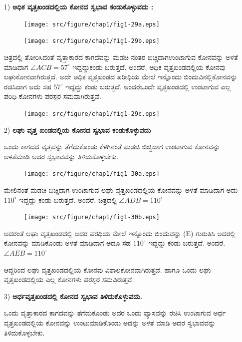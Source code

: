   \eject
    \begin{itemize}
  \item[1)] \textbf{ಅಧಿಕ ವೃತ್ತಖಂಡದಲ್ಲಿಯ ಕೋನದ ಸ್ವಭಾವ ಕಂಡುಕೊಳ್ಳುವದು :}
  \begin{figure}[H]
\centering
\texttt{[image: src/figure/chap1/fig1-29a.eps]}
\end{figure}
\begin{figure}[H]
\centering
\texttt{[image: src/figure/chap1/fig1-29b.eps]}
\end{figure}
 
 ಚಿತ್ರದಲ್ಲಿ ತೋರಿಸಿದಂತೆ ವೃತ್ತಾಕಾರದ ಕಾಗದವನ್ನು ಮಡಚಿ ನಂತರ ಬಿಚ್ಚಿದಾಗ\break ಉಂಟಾಗುವ ಕೋನವನ್ನು ಅಳತೆ ಮಾಡಿದಾಗ $\angle ACB = 57^\circ$ ಇದ್ದದ್ದು\break ಕಂಡು ಬರುತ್ತದೆ. ಅಂದರೆ, ಅಧಿಕ ವೃತ್ತಖಂಡದಲ್ಲಿಯ ಕೋನವು ಲಘುಕೋನವಾಗಿರುತ್ತದೆ. ಅದೇ ಅಧಿಕ ವೃತ್ತಖಂಡದ ಪರೀಧಿಯ ಮೇಲೆ ಇನ್ನೊಂದು ಬಿಂದುವಿನಲ್ಲಿ\break ಕೋನವನ್ನು ರಚಿಸಿದಾಗ ಅದು ಸಹ $57^\circ$ ಇದ್ದದ್ದು ಕಂಡು ಬರುತ್ತದೆ. ಅಂದರೆ\break ಒಂದೇ ವೃತ್ತಖಂಡದಲ್ಲಿ ಉಂಟಾಗುವ ಎಲ್ಲ ಪರಿಧಿ ಕೋನಗಳು ಪರಸ್ಪರ ಸಮ\break ವಾಗಿರುತ್ತವೆ. 
 \begin{figure}[H]
\centering
\texttt{[image: src/figure/chap1/fig1-29c.eps]}
\end{figure}

 \item[2)] \textbf{ಲಘು ವೃತ್ತ ಖಂಡದಲ್ಲಿಯ ಕೋನದ ಸ್ವಭಾವ ಕಂಡುಕೊಳ್ಳುವದು} 
 
 ಒಂದು ಕಾಗದದ ವೃತ್ತವನ್ನು ತೆಗೆದುಕೊಂಡು ಕೆಳಗಿನಂತೆ ಮಡಚಿ ಬಿಚ್ಚಿದಾಗ ಉಂಟಾಗುವ ಕೋನವನ್ನು ಅಳತೆಮಾಡಿ ಅದರ ಸ್ವಭಾವವನ್ನು ತಿಳಿದುಕೊಳ್ಳಬೇಕು. 
 \begin{figure}[H]
\centering
\texttt{[image: src/figure/chap1/fig1-30a.eps]}
\end{figure}
 
 ಮೇಲಿನಂತೆ ಮಡಚಿ ಬಿಚ್ಚಿದಾಗ ಉಂಟಾಗುವ ಲಘು ವೃತ್ತಖಂಡದಲ್ಲಿಯ ಕೋನವನ್ನು ಅಳತೆ ಮಾಡಿದಾಗ ಅದು $110^\circ$ ಇದ್ದದ್ದು ಕಂಡು ಬರುತ್ತದೆ. ಅಂದರೆ. ಚಿತ್ರದಲ್ಲಿ  $\angle ADB = 110^\circ$
  \begin{figure}[H]
\centering
\texttt{[image: src/figure/chap1/fig1-30b.eps]}
\end{figure}
 
 ಅದರಂತೆ ಲಘು ವೃತ್ತಖಂಡದಲ್ಲಿ ಅದರ ಪರಧಿಯ ಮೇಲೆ ಇನ್ನೊಂದು ಬಿಂದುವನ್ನು (E) ಗುರುತಿಸಿ ಅದರಲ್ಲಿ ಕೋನವನ್ನು ಮಾಡಿಕೊಂಡು ಅಳತೆ ಮಾಡಿದಾಗ ಅದೂ ಸಹ  $110^\circ$ ಇದ್ದದ್ದು ಕಂಡು ಬರುತ್ತದೆ. ಅಂದರೆ.  $\angle AEB = 110^\circ$
 
 ಆದ್ದರಿಂದ ಲಘು ವೃತ್ತಖಂಡದಲ್ಲಿಯ ಕೋನವು ವಿಶಾಲಕೋನವಾಗಿರುತ್ತದೆ. ಹಾಗೂ ಒಂದು ಲಘು ವೃತ್ತಖಂಡದಲ್ಲಿಯ ಎಲ್ಲ ಕೋನಗಳು ಪರಸ್ಪರ ಸಮವಿರುತ್ತವೆ.  
 
  \item[3)] \textbf{ಅರ್ಧವೃತ್ತಖಂಡದಲ್ಲಿ ಕೋನದ ಸ್ವಭಾವ ತಿಳಿದುಕೊಳ್ಳುವದು.}
  
  ಒಂದು ವೃತ್ತಾಕಾರದ ಕಾಗದವನ್ನು  ತೆಗೆದುಕೊಂಡು ಅದರ ಒಂದು ವ್ಯಾಸವನ್ನು ರಚಿಸಿ ಉಂಟಾಗುವ ಅರ್ಧ ವೃತ್ತಖಂಡದಲ್ಲಿಯ ಕೋನವನ್ನು ಉಂಟುಮಾಡಿ\break ಕೊಂಡು ಅದನ್ನು ಅಳತೆ ಮಾಡಿ ಅದರ ಸ್ವಭಾವವನ್ನು ತಿಳಿದುಕೊಳ್ಳಬೇಕು. 
 

\end{itemize}
